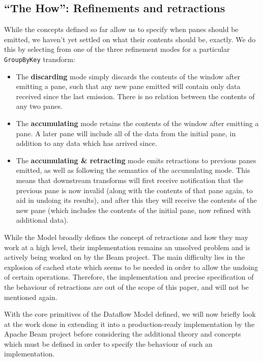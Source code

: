 
\subsection{``The How'': Refinements and retractions}\label{sec:prep:dataflow:how}

While the concepts defined so far allow us to specify when panes should be emitted, we haven't yet settled on what their contents should be, exactly.
We do this by selecting from one of the three refinement modes for a particular \verb|GroupByKey| transform:
\begin{itemize}
	\item The \textbf{discarding} mode simply discards the contents of the window after emitting a pane, such that any new pane emitted will contain only data received since the last emission. There is no relation between the contents of any two panes.
	\item The \textbf{accumulating} mode retains the contents of the window after emitting a pane. A later pane will include all of the data from the initial pane, in addition to any data which has arrived since.
	\item The \textbf{accumulating \& retracting} mode emits retractions to previous panes emitted, as well as following the semantics of the accumulating mode. This means that downstream transforms will first receive notification that the previous pane is now invalid (along with the contents of that pane again, to aid in undoing its results), and after this they will receive the contents of the new pane (which includes the contents of the initial pane, now refined with additional data). 
\end{itemize}


While the Model broadly defines the concept of retractions and how they may work at a high level, their implementation remains an unsolved problem and is actively being worked on by the Beam project.
The main difficulty lies in the explosion of cached state which seems to be needed in order to allow the undoing of certain operations.
Therefore, the implementation and precise specification of the behaviour of retractions are out of the scope of this paper, and will not be mentioned again.

With the core primitives of the Dataflow Model defined, we will now briefly look at the work done in extending it into a production-ready implementation by the Apache Beam project before considering the additional theory and concepts which must be defined in order to specify the behaviour of such an implementation.

